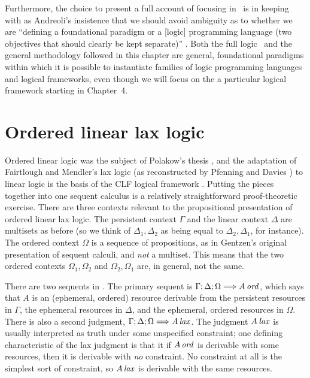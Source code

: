 Furthermore, the choice to present a full account of focusing in
\ollll~is in keeping with as Andreoli's insistence that we should
avoid ambiguity as to whether we are ``defining a foundational
paradigm or a [logic] programming language (two objectives that should
clearly be kept separate)'' \cite{andreoli01focussing}. Both the full
logic \ollll~and the general methodology followed in this chapter are
general, foundational paradigms within which it is possible to
instantiate families of logic programming languages and logical
frameworks, even though we will focus on the a particular logical
framework starting in Chapter~4.

\section{Ordered linear lax logic}
\label{sec:ord-unfocused}

Ordered linear logic was the subject of Polakow's thesis
\cite{polakow01ordered}, and the adaptation of Fairtlough and
Mendler's lax logic \cite{fairtlough95propositional} (as reconstructed
by Pfenning and Davies \cite{pfenning01judgmental}) to linear logic is
the basis of the CLF logical framework
\cite{watkins02concurrent}. Putting the pieces together into one
sequent calculus is a relatively straightforward proof-theoretic
exercise. There are three contexts relevant to the propositional
presentation of ordered linear lax logic.  The persistent context
$\Gamma$ and the linear context $\Delta$ are multisets as before (so
we think of $\Delta_1, \Delta_2$ as being equal to $\Delta_2,
\Delta_1$, for instance). The ordered context $\Omega$ is a sequence
of propositions, as in Gentzen's original presentation of sequent
calculi, and {\it not} a multiset.  This means that the two ordered
contexts $\Omega_1, \Omega_2$ and $\Omega_2, \Omega_1$ are, in
general, not the same.



There are two sequents in \ollll.  The primary sequent is
${\Gamma};{\Delta};{\Omega} \Longrightarrow {{A}\,{{\it ord}}} \mathstrut$, which says that $A$ is an
(ephemeral, ordered) resource derivable from the persistent resources
in $\Gamma$, the ephemeral resources in $\Delta$, and the ephemeral,
ordered resources in $\Omega$. There is also a second judgment,
${\Gamma};{\Delta};{\Omega} \Longrightarrow {{A}\,{{\it lax}}} \mathstrut$. The judgment ${A}\,{{\it lax}}$
is usually interpreted as truth under some unspecified constraint; one
defining characteristic of the lax judgment is that it if ${A}\,{{\it ord}}$
is derivable with some resources, then it is derivable with {\it no}
constraint. No constraint at all is the simplest sort of constraint,
so ${A}\,{{\it lax}}$ is derivable with the same resources.

